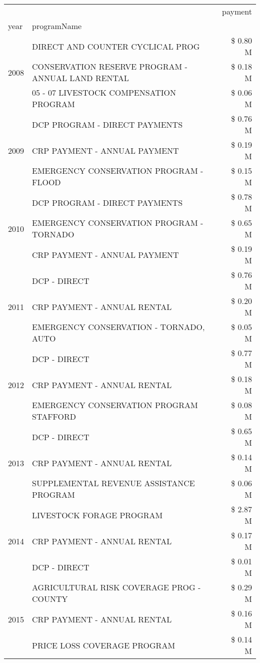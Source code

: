 \begin{tabular}{llr}
\toprule
 &  & payment \\
year & programName &  \\
\midrule
\multirow[t]{3}{*}{2008} & DIRECT AND COUNTER CYCLICAL PROG & \$ 0.80 M \\
 & CONSERVATION RESERVE PROGRAM - ANNUAL LAND RENTAL & \$ 0.18 M \\
 & 05 - 07 LIVESTOCK COMPENSATION PROGRAM & \$ 0.06 M \\
\cline{1-3}
\multirow[t]{3}{*}{2009} & DCP PROGRAM - DIRECT PAYMENTS & \$ 0.76 M \\
 & CRP PAYMENT - ANNUAL PAYMENT & \$ 0.19 M \\
 & EMERGENCY CONSERVATION PROGRAM - FLOOD & \$ 0.15 M \\
\cline{1-3}
\multirow[t]{3}{*}{2010} & DCP PROGRAM - DIRECT PAYMENTS & \$ 0.78 M \\
 & EMERGENCY CONSERVATION PROGRAM - TORNADO & \$ 0.65 M \\
 & CRP PAYMENT - ANNUAL PAYMENT & \$ 0.19 M \\
\cline{1-3}
\multirow[t]{3}{*}{2011} & DCP - DIRECT & \$ 0.76 M \\
 & CRP PAYMENT - ANNUAL RENTAL & \$ 0.20 M \\
 & EMERGENCY CONSERVATION - TORNADO, AUTO & \$ 0.05 M \\
\cline{1-3}
\multirow[t]{3}{*}{2012} & DCP - DIRECT & \$ 0.77 M \\
 & CRP PAYMENT - ANNUAL RENTAL & \$ 0.18 M \\
 & EMERGENCY CONSERVATION PROGRAM STAFFORD & \$ 0.08 M \\
\cline{1-3}
\multirow[t]{3}{*}{2013} & DCP - DIRECT & \$ 0.65 M \\
 & CRP PAYMENT - ANNUAL RENTAL & \$ 0.14 M \\
 & SUPPLEMENTAL REVENUE ASSISTANCE PROGRAM & \$ 0.06 M \\
\cline{1-3}
\multirow[t]{3}{*}{2014} & LIVESTOCK FORAGE PROGRAM & \$ 2.87 M \\
 & CRP PAYMENT - ANNUAL RENTAL & \$ 0.17 M \\
 & DCP - DIRECT & \$ 0.01 M \\
\cline{1-3}
\multirow[t]{3}{*}{2015} & AGRICULTURAL RISK COVERAGE PROG - COUNTY & \$ 0.29 M \\
 & CRP PAYMENT - ANNUAL RENTAL & \$ 0.16 M \\
 & PRICE LOSS COVERAGE PROGRAM & \$ 0.14 M \\
\cline{1-3}

\end{tabular}
